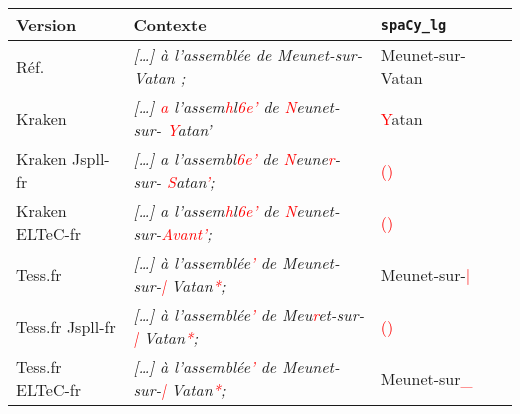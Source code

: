 

\begin{tabular}{|l|l|l|l|}

\hline

\bf{Version} & \bf {Contexte} & \bf{\texttt{spaCy\_lg}}\\
\hline 
Réf.\ & \textit{[\dots]  à l'assemblée de Meunet-sur-Vatan ;} & Meunet-sur-Vatan \\
 Kraken & \textit{[\dots]  \textcolor{red}{a} l'assem\textcolor{red}{h}l\textcolor{red}{6e'} de \textcolor{red}{N}eunet-sur-
\textcolor{red}{Y}atan'}& \textcolor{red}{Y}atan \\ 
 Kraken Jspll-fr &\textit{[\dots]  a l'assembl\textcolor{red}{6e'} de \textcolor{red}{N}eune\textcolor{red}{r}-sur-
\textcolor{red}{S}atan\textcolor{red}{'};}&\textcolor{red}{()} \\
  Kraken ELTeC-fr &\textit{[\dots]  a l'assem\textcolor{red}{h}l\textcolor{red}{6e'} de \textcolor{red}{N}eunet-sur-\textcolor{red}{Avant'};}&\textcolor{red}{()}\\


Tess.fr &\textit{[\dots]  à l'assemblée\textcolor{red}{’} de Meunet-sur-\textcolor{red}{|} Vatan\textcolor{red}{*};  }& Meunet-sur-\textcolor{red}{|} \\
Tess.fr Jspll-fr&\textit{[\dots]  à l'assemblée\textcolor{red}{’} de Meu\textcolor{red}{r}et-sur-
\textcolor{red}{|} Vatan\textcolor{red}{*};}&\textcolor{red}{()} \\
Tess.fr ELTeC-fr& \textit{[\dots]  à l'assemblée\textcolor{red}{’} de Meunet-sur-\textcolor{red}{|} Vatan\textcolor{red}{*};}&Meunet-sur\textcolor{red}{\_}\\
\hline
\end{tabular}



